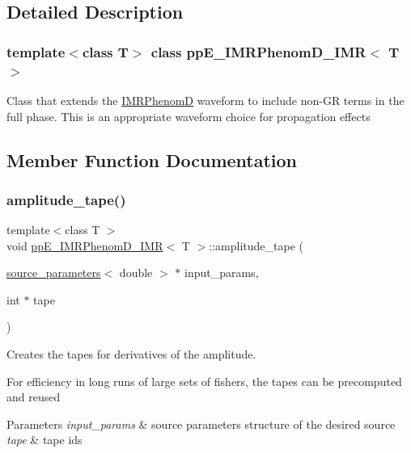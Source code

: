 \subsection{Detailed Description}
\subsubsection*{template$<$class T$>$\newline
class pp\+E\+\_\+\+I\+M\+R\+Phenom\+D\+\_\+\+I\+M\+R$<$ T $>$}

Class that extends the \hyperlink{classIMRPhenomD}{I\+M\+R\+PhenomD} waveform to include non-\/\+GR terms in the full phase. This is an appropriate waveform choice for propagation effects 

\subsection{Member Function Documentation}
\mbox{\label{classppE__IMRPhenomD__IMR_a3119a07c11ed53ae94823b11c5234c4f}} 
\subsubsection{\texorpdfstring{amplitude\+\_\+tape()}{amplitude\_tape()}}
{\footnotesize\ttfamily template$<$class T $>$ \\
void \hyperlink{classppE__IMRPhenomD__IMR}{pp\+E\+\_\+\+I\+M\+R\+Phenom\+D\+\_\+\+I\+MR}$<$ T $>$\+::amplitude\+\_\+tape (\begin{DoxyParamCaption}\item[{\hyperlink{structsource__parameters}{source\+\_\+parameters}$<$ double $>$ $\ast$}]{input\+\_\+params,  }\item[{int $\ast$}]{tape }\end{DoxyParamCaption})\hspace{0.3cm}{\ttfamily [virtual]}}



Creates the tapes for derivatives of the amplitude. 

For efficiency in long runs of large sets of fishers, the tapes can be precomputed and reused 
\begin{DoxyParams}{Parameters}
{\em input\+\_\+params} & source parameters structure of the desired source \\
\hline
{\em tape} & tape ids \\
\hline
\end{DoxyParams}


